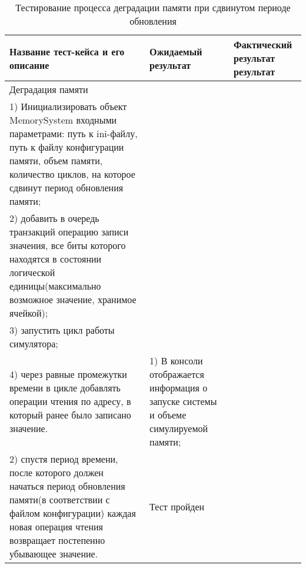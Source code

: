 \begin{longtable}[p]{| >{\raggedright}p{}                     
                     | >{\raggedright}p{}
                     | >{\raggedright\arraybackslash}p{}|}
  \caption{Тестирование процесса деградации памяти при сдвинутом периоде обновления}
  \label{sec:testing:degradation} \tabularnewline

  \hline
      Название тест-кейса и его описание & Ожидаемый результат & Фактический результат результат \\
   \hline
   Деградация памяти\\ 
   1) Инициализировать объект MemorySystem входными параметрами: путь к ini-файлу, путь к файлу конфигурации памяти, объем памяти, количество циклов, на которое сдвинут период обновления памяти; \\
   2) добавить в очередь транзакций операцию записи значения, все биты которого находятся в состоянии логической единицы(максимально возможное значение, хранимое ячейкой);\\
   3) запустить цикл работы симулятора;\\
   4) через равные промежутки времени в цикле добавлять операции чтения по адресу, в который ранее было записано значение.

   &
   1) В консоли отображается информация о запуске системы и объеме симулируемой памяти;\\
   2) спустя период времени, после которого должен начаться период обновления памяти(в соответствии с файлом конфигурации) каждая новая операция чтения возвращает постепенно убывающее значение.

   &
   Тест пройден \\
   \hline
\end{longtable}

